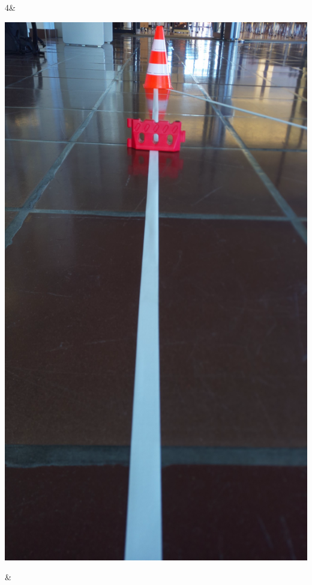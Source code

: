 \begin{table}[H]
\begin{tabularx}
        4&
\begin{minipage}{.18\textwidth}
\includegraphics[width=\linewidth]{assets/IT/testing/yolo/pylon_behind_obst.png}
\end{minipage}
        &
\begin{minipage}{.18\textwidth}

\end{minipage}
\end{tabularx}
\end{table}

